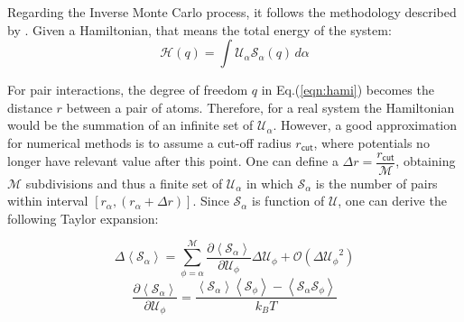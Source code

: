 \documentclass[10pt,a4paper,twoside]{article}
\begin{document}
 Regarding the Inverse Monte Carlo process, it follows the methodology described by . Given a Hamiltonian, that means the total energy of the system:
 \begin{equation}
\mathcal{H}(q) = \displaystyle \int \mathcal{U}_\alpha\mathcal{S}_\alpha(q) \,d\alpha
\label{eqn:hami}
\end{equation}

For pair interactions, the degree of freedom $q$ in Eq.(\ref{eqn:hami}) becomes the distance $r$ between a pair of atoms. Therefore, for a real system the Hamiltonian would be the summation of an infinite set of $\mathcal{U}_\alpha$. However, a good approximation for numerical methods is to assume a cut-off radius $r_{\mathsf{cut}}$, where potentials no longer have relevant value after this point. One can define a $\Delta r = \dfrac{r_{\mathsf{cut}}}{\mathcal{M}}$, obtaining $\mathcal{M}$ subdivisions and thus a finite set of  $\mathcal{U}_{\alpha}$ in which $\mathcal{S}_\alpha$ is the number of pairs within  interval $[r_\alpha,(r_\alpha + \Delta r)]$. Since $\mathcal{S}_\alpha$ is function of $\mathcal{U}$, one can derive the following Taylor expansion:

 \begin{equation}
\Delta\left\langle\mathcal{S}_\alpha\right\rangle = \sum_{\phi=\alpha}^\mathcal{M}\dfrac{\partial\left\langle\mathcal{S}_\alpha\right\rangle}{\partial\mathcal{U}_\phi}\Delta\mathcal{U}_\phi + \mathcal{O}({\Delta\mathcal{U}_\phi}^2)
\label{eqn:inv1}
\end{equation}
 \begin{equation}
\dfrac{\partial\left\langle\mathcal{S}_\alpha\right\rangle}{\partial\mathcal{U}_\phi} = \dfrac{ \left\langle\mathcal{S}_\alpha\right\rangle\left\langle\mathcal{S}_\phi\right\rangle - \left\langle\mathcal{S}_\alpha\mathcal{S}_\phi\right\rangle}{k_B T}
\label{eqn:inv2}
\end{equation}
\end{document}
